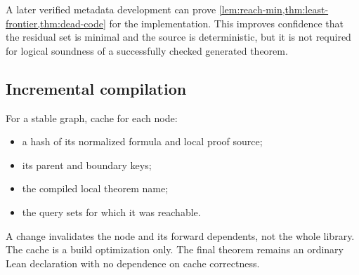 A later verified metadata development can prove \cref{lem:reach-min,thm:least-frontier,thm:dead-code} for the implementation.  This improves confidence that the residual set is minimal and the source is deterministic, but it is not required for logical soundness of a successfully checked generated theorem.

\subsection{Incremental compilation}

For a stable graph, cache for each node:
\begin{itemize}
  \item a hash of its normalized formula and local proof source;
  \item its parent and boundary keys;
  \item the compiled local theorem name;
  \item the query sets for which it was reachable.
\end{itemize}
A change invalidates the node and its forward dependents, not the whole library.  The cache is a build optimization only.  The final theorem remains an ordinary Lean declaration with no dependence on cache correctness.
